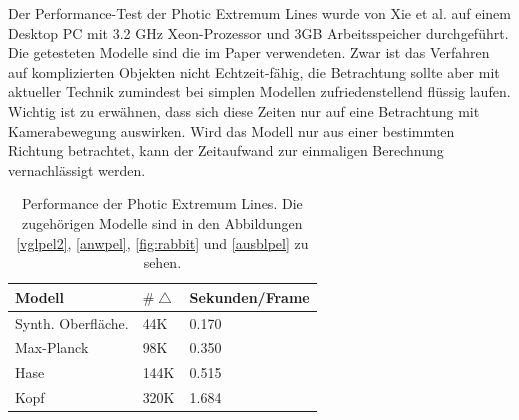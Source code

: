 \documentclass{paperStyle}
\begin{document}
Der Performance-Test der Photic Extremum Lines wurde von Xie et al. \cite{Xie2007} auf einem Desktop PC mit 3.2 GHz Xeon-Prozessor und 3GB Arbeitsspeicher durchgeführt. Die getesteten Modelle sind die im Paper verwendeten. Zwar ist das Verfahren auf komplizierten Objekten nicht Echtzeit-fähig, die Betrachtung sollte aber mit aktueller Technik zumindest bei simplen Modellen zufriedenstellend flüssig laufen.
Wichtig ist zu erwähnen, dass sich diese Zeiten nur auf eine Betrachtung mit Kamerabewegung auswirken. Wird das Modell nur aus einer bestimmten Richtung betrachtet, kann der Zeitaufwand zur einmaligen Berechnung vernachlässigt werden. 
\begin{table}[htb]

\begin{tabular}{|l|ll|}
\hline
Modell & $\#\bigtriangleup$ & Sekunden/Frame\\
\hline
Synth. Oberfläche. & 44K & 0.170 \\
Max-Planck & 98K & 0.350 \\
Hase & 144K & 0.515 \\
Kopf & 320K & 1.684 \\

\hline
\end{tabular}
\caption{Performance der Photic Extremum Lines. Die zugehörigen Modelle sind in den Abbildungen \ref{vglpel2}, \ref{anwpel}, \ref{fig:rabbit} und \ref{ausblpel} zu sehen.  \cite{Xie2007}} 
\label{tab:TableExample}
\end{table}
\end{document}
